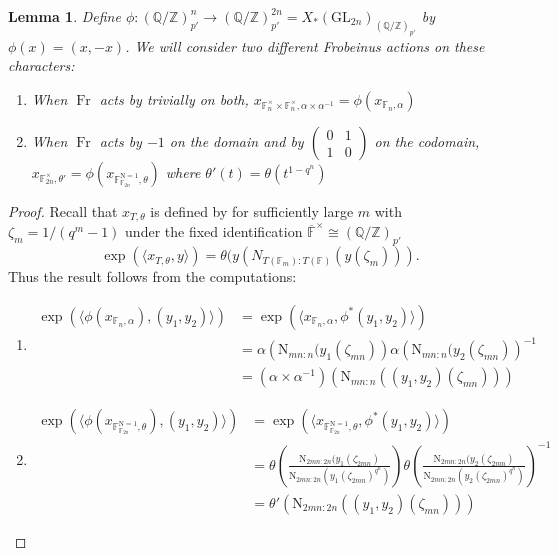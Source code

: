 \documentclass[12pt, reqno]{amsart}
\newtheorem{lemma}[theorem]{Lemma}
\theoremstyle{definition}
\theoremstyle{definition}
\theoremstyle{definition}
\newcommand{\multiplicativegroup}[1]{#1^{\times}}
\newcommand{\GL}{\mathrm{GL}}
\newcommand{\FieldNorm}[2]{\mathrm{N}_{#1:#2}}
\newcommand{\aFieldNorm}{\mathrm{N}}
\newcommand{\finiteField}{\mathbb{F}}
\newcommand{\finiteFieldExtension}[1]{\finiteField_{#1}}
\newcommand{\NormOneGroup}[1]{\finiteFieldExtension{#1}^{\aFieldNorm = 1}}
\newcommand{\algebraicClosure}[1]{\overline{#1}}
\newcommand{\Frobenius}{\operatorname{Fr}}
\begin{document}
\begin{lemma}
\label{lem:cochar_computation}
    Define $\phi:(\mathbb{Q}/\mathbb{Z})_{p'}^n \to (\mathbb{Q}/\mathbb{Z})_{p'}^{2n} = X_*(\GL_{2n})_{(\mathbb{Q}/\mathbb{Z})_{p'}}$ by $\phi(x) = (x,-x)$. We will consider two different Frobeinus actions on these characters:
    \begin{enumerate}
        \item When $\Frobenius$ acts by trivially on both, $x_{\finiteFieldExtension{n}^\times \times \finiteFieldExtension{n}^\times,\alpha \times \alpha^{-1}} = \phi(x_{\finiteFieldExtension{n},\alpha})$
        \item When $\Frobenius$ acts by $-1$ on the domain and by $\begin{pmatrix}
            0 & 1 \\
            1 & 0\end{pmatrix}$ on the codomain, $x_{\finiteField_{2n}^\times,\theta'}=\phi(x_{\NormOneGroup{\finiteFieldExtension{2n}},\theta})$ where $\theta'(t) = \theta(t^{1-q^n})$
    \end{enumerate}
\end{lemma}
\begin{proof}
Recall that $x_{T,\theta}$ is defined by for sufficiently large $m$ with $\zeta_m = 1/(q^m-1)$ under the fixed identification $\multiplicativegroup{\algebraicClosure{\finiteField}} \cong (\mathbb{Q}/\mathbb{Z})_{p'}$
\[
    \exp(\langle x_{T,\theta},y\rangle) = \theta(y(N_{T(\finiteField_m):T(\finiteField)}(y(\zeta_m))).
\]
Thus the result follows from the computations:
\begin{enumerate}
	\item \begin{align*}
		\exp(\langle\phi(x_{\finiteFieldExtension{n},\alpha}),(y_1,y_2)\rangle) &= \exp(\langle x_{\finiteFieldExtension{n},\alpha},\phi^*(y_1,y_2)\rangle) \\
		&= \alpha\left(\FieldNorm{mn}{n}(y_1(\zeta_{mn})\right) \alpha\left(\FieldNorm{mn}{n}(y_2(\zeta_{mn})\right)^{-1} \\
		&= \left(\alpha\times\alpha^{-1}\right)\left(\FieldNorm{mn}{n}((y_1,y_2)(\zeta_{mn}))\right)
	\end{align*}
	\item \begin{align*}
		\exp(\langle\phi(x_{\NormOneGroup{\finiteFieldExtension{2n}},\theta}),(y_1,y_2)\rangle) &= \exp(\langle x_{\NormOneGroup{\finiteFieldExtension{2n}},\theta},\phi^*(y_1,y_2)\rangle) \\
		&= \theta\left(\frac{\FieldNorm{2mn}{2n}(y_1(\zeta_{2mn})}{\FieldNorm{2mn}{2n}\left(y_1(\zeta_{2mn})^{q^n}\right)}\right) \theta\left(\frac{\FieldNorm{2mn}{2n}(y_2(\zeta_{2mn})}{\FieldNorm{2mn}{2n}\left(y_2(\zeta_{2mn})^{q^n}\right)}\right)^{-1} \\
		&= \theta'\left(\FieldNorm{2mn}{2n}((y_1,y_2)(\zeta_{mn}))\right)
	\end{align*}
\end{enumerate}
\end{proof}
\end{document}

